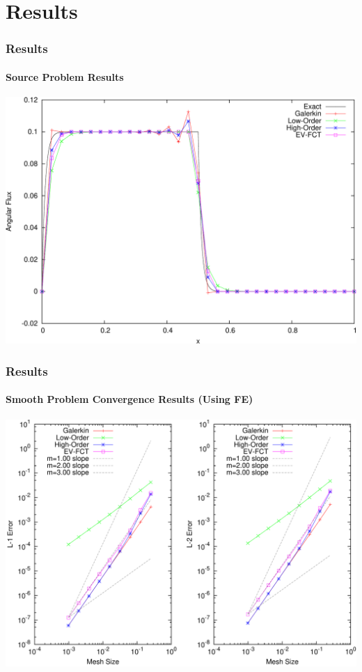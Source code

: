 \documentclass{beamer}
\begin{document}
\section{Results}
\begin{frame}
\frametitle{Results}
\framesubtitle{Source Problem Results}

\includegraphics[width=\textwidth]{./figures/solutions_source_FE.pdf}

\end{frame}
\begin{frame}
\frametitle{Results}
\framesubtitle{Smooth Problem Convergence Results (Using FE)}

\includegraphics[width=\textwidth]{./figures/convergence_smooth_FE.pdf}

\end{frame}
\end{document}
